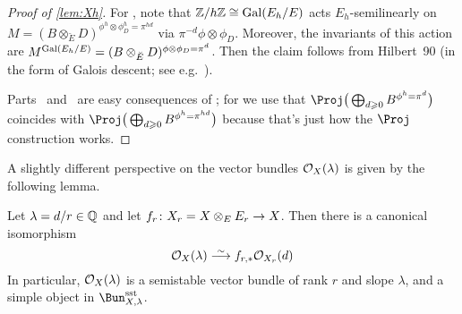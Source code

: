 \documentclass[a4paper, 10pt, oneside, DIV=9, chapterprefix=true, numbers=enddot,bibliography=totoc]{scrbook}
\begin{document}
\begin{proof}[Proof of \cref{lem:Xh}]
	For , note that $\mathbb{Z}/h\mathbb{Z}\cong \operatorname{Gal}(E_h/E)$ acts $E_h$-semilinearly on $M=(B\otimes_{\breve{E}}D)^{\phi^h\otimes\phi_D^h=\pi^{hd}}$ via $\pi^{-d}\phi\otimes\phi_D$. Moreover, the invariants of this action are $M^{\Gal(E_h/E)}=(B\otimes_{\breve{E}}D)^{\phi\otimes\phi_D=\pi^d}$. Then the claim follows from Hilbert~90 (in the form of Galois descent; see e.g.\ \cite[I~(5.2)]{sga4.5}).
	
	Parts~ and~ are easy consequences of ; for  we use that $\Proj\big(\bigoplus_{d\geq 0}B^{\phi^h=\pi^d}\big)$ coincides with $\Proj \big(\bigoplus_{d\geq 0}B^{\phi^h=\pi^{hd}}\big)$ because that's just how the $\Proj$ construction works.
\end{proof}
A slightly different perspective on the vector bundles $\mathcal{O}_X(\lambda)$ is given by the following lemma.
\begin{lem}
	Let $\lambda=d/r\in \mathbb{Q}$ and let $f_r\colon X_r=X\otimes_EE_r\morphism X$. Then there is a canonical isomorphism
	\begin{equation*}
		\Oo_X(\lambda)\isomorphism f_{r,*}\Oo_{X_r}(d)
	\end{equation*}
	In particular, $\mathcal{O}_X(\lambda)$ is a semistable vector bundle of rank $r$ and slope $\lambda$, and a simple object in $\Bun_{X,\lambda}^\sst$.
\end{lem}
\end{document}
